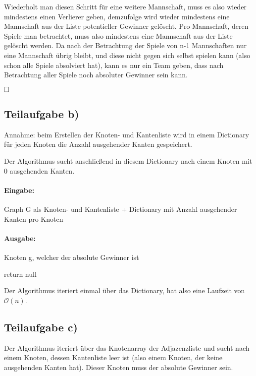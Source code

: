 \documentclass[12pt]{scrartcl}%
\theoremstyle{nonumberplain}
\newcommand{\bO}[1]{\mathcal O(#1)}
\begin{document}
Wiederholt man diesen Schritt für eine weitere Mannschaft, muss es also wieder mindestens einen Verlierer geben, demzufolge wird wieder mindestens eine Mannschaft aus der Liste potentieller Gewinner gelöscht. Pro Mannschaft, deren Spiele man betrachtet, muss also mindestens eine Mannschaft aus der Liste gelöscht werden. Da nach der Betrachtung der Spiele von n-1 Mannschaften nur eine Mannschaft übrig bleibt, und diese nicht gegen sich selbst spielen kann (also schon alle Spiele absolviert hat), kann es nur ein Team geben, dass nach Betrachtung aller Spiele noch absoluter Gewinner sein kann. 

$\hfill \square$

\subsection*{Teilaufgabe b)}

Annahme: beim Erstellen der Knoten- und Kantenliste wird in einem Dictionary für jeden Knoten die Anzahl ausgehender Kanten gespeichert. 

Der Algorithmus sucht anschließend in diesem Dictionary nach einem Knoten mit 0 ausgehenden Kanten.

\paragraph{Eingabe:} Graph G als Knoten- und Kantenliste + Dictionary mit Anzahl ausgehender Kanten pro Knoten

\paragraph{Ausgabe:} Knoten g, welcher der absolute Gewinner ist

\begin{algorithm}
	 {
	}
	return null\;
\end{algorithm}

Der Algorithmus iteriert einmal über das Dictionary, hat also eine Laufzeit von $\bO{n}$.

\subsection*{Teilaufgabe c)}

Der Algorithmus iteriert über das Knotenarray der Adjazenzliste und sucht nach einem Knoten, dessen Kantenliste leer ist (also einem Knoten, der keine ausgehenden Kanten hat). Dieser Knoten muss der absolute Gewinner sein.
\end{document}

